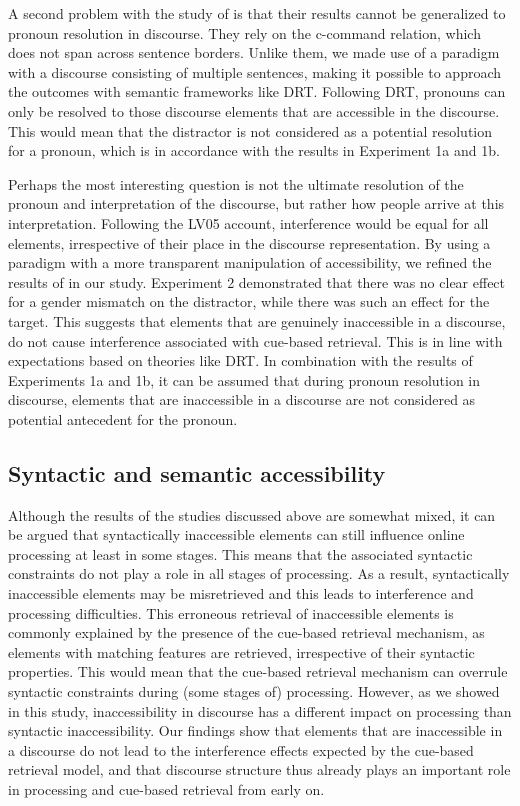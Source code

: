 \documentclass[11pt]{article} %
\begin{document}
A second problem with the study of \cite{kush+15} is that their results cannot be generalized to pronoun resolution in discourse. They rely on the c-command relation, which does not span across sentence borders. Unlike them, we made use of a paradigm with a discourse consisting of multiple sentences, making it possible to approach the outcomes with semantic frameworks like DRT. Following DRT, pronouns can only be resolved to those discourse elements that are accessible in the discourse. This would mean that the distractor is not considered as a potential resolution for a pronoun, which is in accordance with the results in Experiment 1a and 1b. 

Perhaps the most interesting question is not the ultimate resolution of the pronoun and interpretation of the discourse, but rather how people arrive at this interpretation. Following the LV05 account, interference would be equal for all elements, irrespective of their place in the discourse representation. By using a paradigm with a more transparent manipulation of accessibility, we refined the results of \cite{kush+15} in our study. Experiment 2 demonstrated that there was no clear effect for a gender mismatch on the distractor, while there was such an effect for the target. This suggests that elements that are genuinely inaccessible in a discourse, do not cause interference associated with cue-based retrieval. This is in line with expectations based on theories like DRT. In combination with the results of Experiments 1a and 1b, it can be assumed that during pronoun resolution in discourse, elements that are inaccessible in a discourse are not considered as potential antecedent for the pronoun.

\subsection{Syntactic and semantic accessibility}
Although the results of the studies discussed above are somewhat mixed, it can be argued that syntactically inaccessible elements can still influence online processing at least in some stages. This means that the associated syntactic constraints do not play a role in all stages of processing. As a result, syntactically inaccessible elements may be misretrieved and this leads to interference and processing difficulties. This erroneous retrieval of inaccessible elements is commonly explained by the presence of the cue-based retrieval mechanism, as elements with matching features are retrieved, irrespective of their syntactic properties. This would mean that the cue-based retrieval mechanism can overrule syntactic constraints during (some stages of) processing. However, as we showed in this study, inaccessibility in discourse has a different impact on processing than syntactic inaccessibility. Our findings show that elements that are inaccessible in a discourse do not lead to the interference effects expected by the cue-based retrieval model, and that discourse structure thus already plays an important role in processing and cue-based retrieval from early on. 
\end{document}

